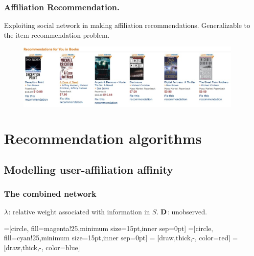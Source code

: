 \documentclass{beamer}
\begin{document}
\begin{frame}
\frametitle{Affiliation Recommendation.}
\begin{itemize}
\pitem Exploiting social network in making affiliation recommendations.
\pitem Generalizable to the item recommendation problem.
\begin{figure}
\includegraphics[scale=0.25]{figures/amazonRecommendations.eps}
\end{figure}
\end{itemize}
\end{frame}

\section{Recommendation algorithms}
\subsection{Modelling user-affiliation affinity}
\begin{frame}
\frametitle{The combined network}
\begin{itemize}
 \pitem $\lambda$: relative weight associated with information in $S$.
 \pitem $\mathbf{D}$: unobserved.
\end{itemize}
=[circle, fill=magenta!25,minimum size=15pt,inner sep=0pt]
=[circle, fill=cyan!25,minimum size=15pt,inner sep=0pt]
 = [draw,thick,-, color=red]
 = [draw,thick,-, color=blue]
\end{frame}
\end{document}
